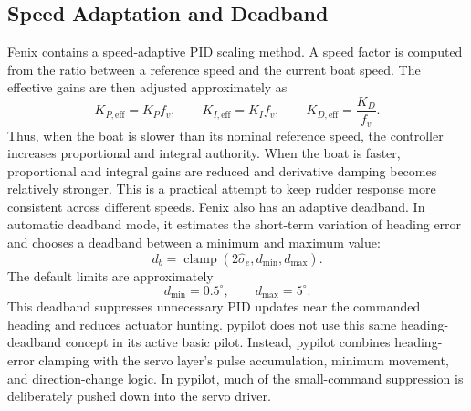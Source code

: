 \documentclass[11pt,twocolumn]{article}
\begin{document}
\subsection{Speed Adaptation and Deadband}
Fenix contains a speed-adaptive PID scaling method.  A speed factor is
computed from the ratio between a reference speed and the current boat
speed.  The effective gains are then adjusted approximately as
\[
K_{P,\mathrm{eff}} = K_P f_v,
\qquad
K_{I,\mathrm{eff}} = K_I f_v,
\qquad
K_{D,\mathrm{eff}} = \frac{K_D}{f_v}.
\]
Thus, when the boat is slower than its nominal reference speed, the
controller increases proportional and integral authority.  When the boat
is faster, proportional and integral gains are reduced and derivative
damping becomes relatively stronger.  This is a practical attempt to keep
rudder response more consistent across different speeds.
Fenix also has an adaptive deadband.  In automatic deadband mode, it
estimates the short-term variation of heading error and chooses a
deadband between a minimum and maximum value:
\[
d_b
=
\operatorname{clamp}
\left(
2 \hat{\sigma}_e,
d_{\min},
d_{\max}
\right).
\]
The default limits are approximately
\[
d_{\min}=0.5^\circ,
\qquad
d_{\max}=5^\circ .
\]
This deadband suppresses unnecessary PID updates near the commanded
heading and reduces actuator hunting.
pypilot does not use this same heading-deadband concept in its active
basic pilot.  Instead, pypilot combines heading-error clamping with the
servo layer's pulse accumulation, minimum movement, and direction-change
logic.  In pypilot, much of the small-command suppression is deliberately
pushed down into the servo driver.
\end{document}
